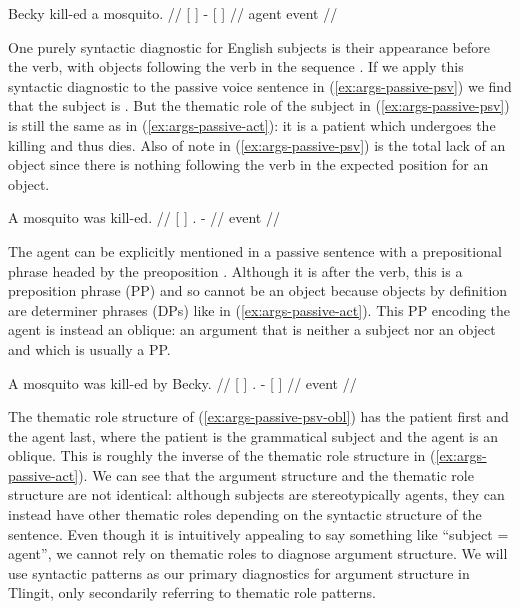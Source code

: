 \ex\label{ex:args-passive-act}%
%
\begingl
	\gla	{} Becky {} kill-ed {} a mosquito. {} //
	\glc	{}[  {}] - {}[   {}] //
	\gld	{} agent {} event {}  {} {} //
\endgl
\xe

One purely syntactic diagnostic for English subjects is their appearance before the verb, with objects following the verb in the sequence .
If we apply this syntactic diagnostic to the passive voice sentence in (\ref{ex:args-passive-psv}) we find that the subject is .
But the thematic role of the subject  in (\ref{ex:args-passive-psv}) is still the same as in (\ref{ex:args-passive-act}): it is a patient which undergoes the killing and thus dies.
Also of note in (\ref{ex:args-passive-psv}) is the total lack of an object since there is nothing following the verb in the expected position for an object.

\ex\label{ex:args-passive-psv}%
%
\begingl
	\gla	{} A mosquito {} was kill-ed. //
	\glc	{}[   {}] . - //
	\gld	{}  {} {} {} event //
\endgl
\xe

The agent can be explicitly mentioned in a passive sentence with a prepositional phrase headed by the preoposition .
Although it is after the verb, this is a preposition phrase (PP) and so cannot be an object because objects by definition are determiner phrases (DPs) like  in (\ref{ex:args-passive-act}).
This PP  encoding the agent is instead an oblique: an argument that is neither a subject nor an object and which is usually a PP.

\ex\label{ex:args-passive-psv-obl}%
%
\begingl
	\gla	{} A mosquito {} was kill-ed {} by Becky. {} //
	\glc	{}[   {}] . - {}[   {}] //
	\gld	{}  {} {} {} event {}  {} {} //
\endgl
\xe

The thematic role structure of (\ref{ex:args-passive-psv-obl}) has the patient first and the agent last, where the patient is the grammatical subject and the agent is an oblique.
This is roughly the inverse of the thematic role structure in (\ref{ex:args-passive-act}).
We can see that the argument structure and the thematic role structure are not identical: although subjects are stereotypically agents, they can instead have other thematic roles depending on the syntactic structure of the sentence.
Even though it is intuitively appealing to say something like “subject = agent”, we cannot rely on thematic roles to diagnose argument structure.
We will use syntactic patterns as our primary diagnostics for argument structure in Tlingit, only secondarily referring to thematic role patterns.

